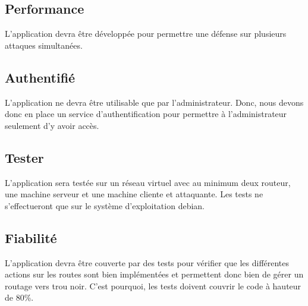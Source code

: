 \subsection{Performance}
L'application devra être développée pour permettre une défense sur plusieurs attaques simultanées. %

\subsection{Authentifié}
L’application ne devra être utilisable que par l'administrateur. Donc, nous devons donc en place un service d'authentification pour permettre à l'administrateur seulement d'y avoir accès.

\subsection{Tester}
L'application sera testée sur un réseau virtuel avec au minimum deux routeur, une machine serveur et une machine cliente et attaquante. Les tests ne s'effectueront que sur le système d'exploitation debian.

\subsection{Fiabilité}
L'application devra être couverte par des tests pour vérifier que les différentes actions sur les routes sont bien implémentées et permettent donc bien de gérer un routage vers trou noir. C'est pourquoi, les tests doivent couvrir le code à hauteur de 80\%.



